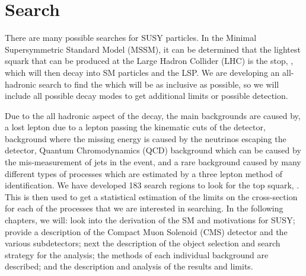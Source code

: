 \section{Search}
\label{sec:search}

There are many possible searches for SUSY particles. In the Minimal Supersymmetric Standard Model (MSSM), it can be determined that the lightest squark that can be produced at the Large Hadron Collider (LHC) is the stop, \st{}, which will then decay into SM particles and the LSP.  We are developing an all-hadronic search to find the \st{} which will be as inclusive as possible, so we will include all possible decay modes to get additional limits or possible detection. 

Due to the all hadronic aspect of the decay, the main backgrounds are caused by, a lost lepton due to a lepton passing the kinematic cuts of the detector, \Znunu{} background where the missing energy is caused by the neutrinos escaping the detector, Quantum Chromodynamics (QCD) background which can be caused by the mis-measurement of jets in the event, and a rare background caused by many different types of processes which are estimated by a three lepton method of identification. We have developed 183 search regions to look for the top squark, \st{}. This is then used to get a statistical estimation of the limits on the cross-section for each of the processes that we are interested in searching. In the following chapters, we will: look into the derivation of the SM and motivations for SUSY; provide a description of the Compact Muon Solenoid (CMS) detector and the various subdetectors; next the description of the object selection and search strategy for the analysis; the methods of each individual background are described; and the description and analysis of the results and limits. 

